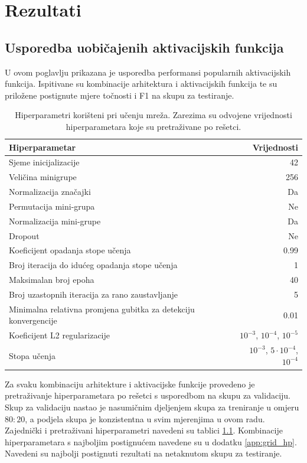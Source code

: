 \documentclass[times, utf8, numeric, diplomski]{fer}
\begin{document}
\chapter{Rezultati}
\label{sec:rezultati}

\section{Usporedba uobičajenih aktivacijskih funkcija}
U ovom poglavlju prikazana je usporedba performansi popularnih aktivacijskih funkcija. Ispitivane su kombinacije arhitektura i aktivacijskih funkcija te su priložene postignute mjere točnosti i F1 na skupu za testiranje.

\begin{table}[H]
\centering
\begin{tabular}{lr}
Hiperparametar & Vrijednosti \\
\hline
Sjeme inicijalizacije & 42 \\
Veličina minigrupe & 256 \\
Normalizacija značajki & Da \\
Permutacija mini-grupa & Ne \\
Normalizacija mini-grupe & Da \\
Dropout & Ne \\
Koeficijent opadanja stope učenja & 0.99 \\
Broj iteracija do idućeg opadanja stope učenja & 1 \\
Maksimalan broj epoha & 40 \\
Broj uzastopnih iteracija za rano zaustavljanje & 5 \\
Minimalna relativna promjena gubitka za detekciju konvergencije & 0.01 \\
\hline
Koeficijent L2 regularizacije & $10^{-3}$, $10^{-4}$, $10^{-5}$ \\
Stopa učenja & $10^{-3}$, $5 \cdot 10^{-4}$, $10^{-4}$
\end{tabular}
\caption{Hiperparametri korišteni pri učenju mreža. Zarezima su odvojene vrijednosti hiperparametara koje su pretraživane po rešetci.}
\label{tab:hp_common}
\end{table}

Za svaku kombinaciju arhitekture i aktivacijske funkcije provedeno je pretraživanje hiperparametara po rešetci s usporedbom na skupu za validaciju. Skup za validaciju nastao je nasumičnim djeljenjem skupa za treniranje u omjeru $80:20$, a podjela skupa je konzistentna u svim mjerenjima u ovom radu. Zajednički i pretraživani hiperparametri navedeni su tablici \ref{tab:hp_common}. Kombinacije hiperparametara s najboljim postignućem navedene su u dodatku \ref{app:grid_hp}. Navedeni su najbolji postignuti rezultati na netaknutom skupu za testiranje.
\end{document}

